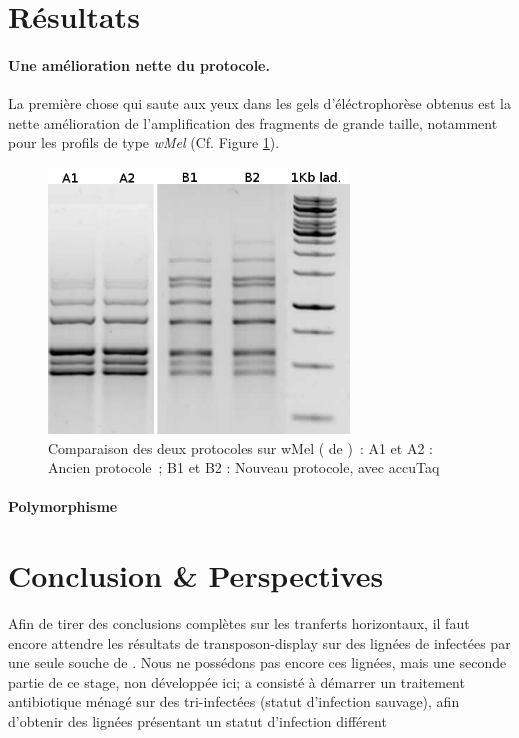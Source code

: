\section{Résultats} %
\label{sec:résultats}

\paragraph{Une amélioration nette du protocole.} %
\label{par:proto}
La première chose qui saute aux yeux dans les gels d'éléctrophorèse obtenus est la nette amélioration de l'amplification des fragments de grande taille, notamment pour les profils de type \textit{wMel} (Cf. Figure \ref{fig:wMelcomp}). 
\begin{figure}[tb]
	\begin{center}
		\includegraphics[width=80mm]{images/wMel_comp.png}
	\end{center}
	\caption{Comparaison des deux protocoles sur wMel ( de )~:
	A1 et A2 : Ancien protocole\cite{memHH}~;
	B1 et B2 : Nouveau protocole, avec accuTaq}
	\label{fig:wMelcomp}
\end{figure}

\paragraph{Polymorphisme} %
\label{par:polymorphisme}



\section{Conclusion \& Perspectives} %
\label{sec:ccl}
Afin de tirer des conclusions complètes sur les tranferts horizontaux, il faut encore attendre les résultats de transposon-display sur des lignées de  infectées par une seule souche de .
Nous ne possédons pas encore ces lignées, mais une seconde partie de ce stage, non développée ici; a consisté à démarrer un traitement antibiotique ménagé sur des  tri-infectées (statut d'infection sauvage), afin d'obtenir des lignées présentant un statut d'infection différent 
